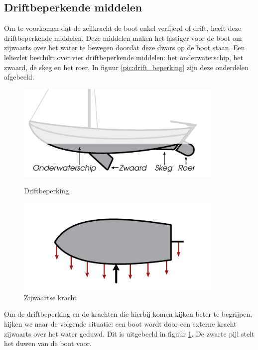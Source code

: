 \subsection{Driftbeperkende middelen}
Om te voorkomen dat de zeilkracht de boot enkel verlijerd of drift, heeft deze driftbeperkende middelen. Deze middelen maken het lastiger voor de boot om zijwaarts over het water te bewegen doordat deze dwars op de boot staan. Een lelievlet beschikt over vier driftbeperkende middelen: het onderwaterschip, het zwaard, de skeg en het roer. In figuur \ref{pic:drift_beperking} zijn deze onderdelen afgebeeld.

\begin{figure}[H]
	\centering
	\begin{minipage}[b]{0.48\textwidth}
		\centering
		\includegraphics[width=0.90\textwidth]{Hoofdstukken/Krachten/pdf/lateraal_driftbeperking.pdf}
		\caption{Driftbeperking}
		\label{pic:drift_beperking}
	\end{minipage}
	\hfill
	\begin{minipage}[b]{0.48\textwidth}
		\centering
		\includegraphics[width=0.90\textwidth]{Hoofdstukken/Krachten/pdf/lateraal_boven.pdf}
		\caption{Zijwaartse kracht}
		\label{pic:zijwaarts}
	\end{minipage}
\end{figure}
Om de driftbeperking en de krachten die hierbij komen kijken beter te begrijpen, kijken we naar de volgende situatie: een boot wordt door een externe kracht zijwaarts over het water geduwd. Dit is uitgebeeld in figuur \ref{pic:zijwaarts}. De zwarte pijl stelt het duwen van de boot voor. 

